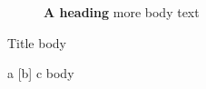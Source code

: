 \begin{figure}
  \begin{center}
    {\bfseries A heading} more body text
  \end{center}
\end{figure}

\begin{frame}{Title}
  body
\end{frame}

\begin{myenv}{a}
  [b] {c} body
\end{myenv}

